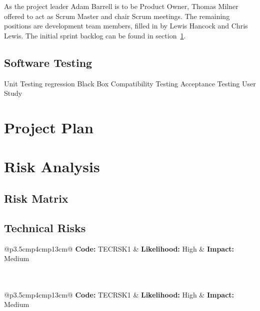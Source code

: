 \documentclass[11pt,a4paper]{article}
\renewcommand{\arraystretch}{1.5}
\begin{document}
As the project leader Adam Barrell is to be Product Owner, Thomas Milner offered to act as Scrum Master and chair Scrum meetings. The remaining positions are development team members, filled in by Lewis Hancock and Chris Lewis. The initial sprint backlog can be found in section~\ref{sec:project-plan}.

\subsection{Software Testing}
Unit Testing
	regression
	Black Box
Compatibility Testing
Acceptance Testing
User Study

\section{Project Plan}
\label{sec:project-plan}

\section{Risk Analysis}
\label{sec:risk-analysis}

\subsection{Risk Matrix}

\subsection{Technical Risks}
\label{sec:tech-risks}

\renewcommand{\arraystretch}{1.2}

\noindent\begin{tabular}{@{}p{3.5cm}p{4cm}p{13cm}@{}}
\textbf{Code:} TECRSK1 & \textbf{Likelihood:} High & \textbf{Impact:} Medium \\ 
 \\ 
 \\ 
\end{tabular} 

\vspace{0.5 cm}

\noindent\begin{tabular}{@{}p{3.5cm}p{4cm}p{13cm}@{}}
\textbf{Code:} TECRSK1 & \textbf{Likelihood:} High & \textbf{Impact:} Medium \\ 
 \\ 
 \\ 
\end{tabular} 
\end{document}
